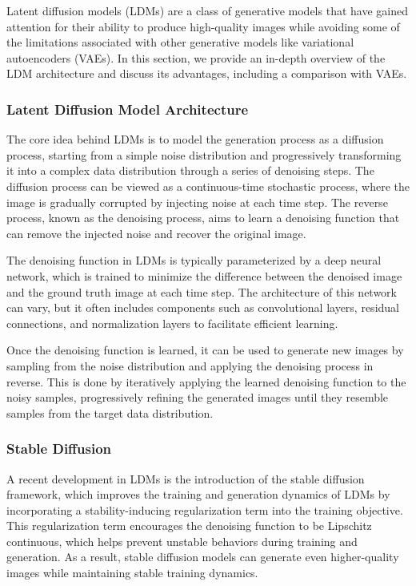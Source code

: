 \documentclass[12pt]{article}
\begin{document}
Latent diffusion models (LDMs) are a class of generative models that have gained attention for their ability to produce high-quality images while avoiding some of the limitations associated with other generative models like variational autoencoders (VAEs). In this section, we provide an in-depth overview of the LDM architecture and discuss its advantages, including a comparison with VAEs.

\subsubsection{Latent Diffusion Model Architecture}

The core idea behind LDMs is to model the generation process as a diffusion process, starting from a simple noise distribution and progressively transforming it into a complex data distribution through a series of denoising steps. The diffusion process can be viewed as a continuous-time stochastic process, where the image is gradually corrupted by injecting noise at each time step. The reverse process, known as the denoising process, aims to learn a denoising function that can remove the injected noise and recover the original image.

The denoising function in LDMs is typically parameterized by a deep neural network, which is trained to minimize the difference between the denoised image and the ground truth image at each time step. The architecture of this network can vary, but it often includes components such as convolutional layers, residual connections, and normalization layers to facilitate efficient learning.

Once the denoising function is learned, it can be used to generate new images by sampling from the noise distribution and applying the denoising process in reverse. This is done by iteratively applying the learned denoising function to the noisy samples, progressively refining the generated images until they resemble samples from the target data distribution.

\subsubsection{Stable Diffusion}

A recent development in LDMs is the introduction of the stable diffusion framework, which improves the training and generation dynamics of LDMs by incorporating a stability-inducing regularization term into the training objective. This regularization term encourages the denoising function to be Lipschitz continuous, which helps prevent unstable behaviors during training and generation. As a result, stable diffusion models can generate even higher-quality images while maintaining stable training dynamics.
\end{document}
